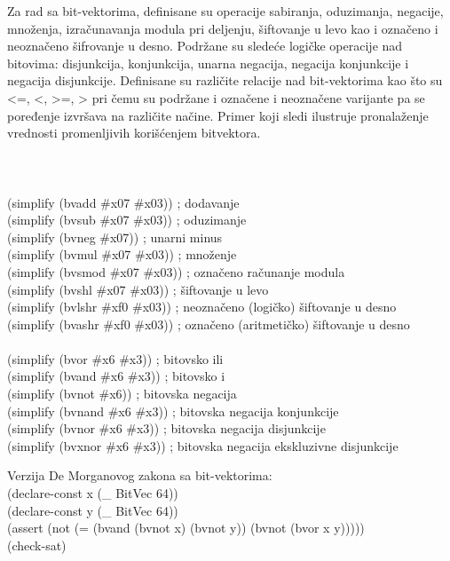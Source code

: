 \documentclass[12pt,oneside]{memoir}
\begin{document}
Za rad sa bit-vektorima, definisane su operacije sabiranja, oduzimanja, negacije, množenja, izračunavanja modula pri deljenju, šiftovanje u levo kao i označeno i neoznačeno šifrovanje u desno. Podržane su sledeće logičke operacije nad bitovima: disjunkcija, konjunkcija, unarna negacija, negacija konjunkcije i negacija disjunkcije. Definisane su različite relacije nad bit-vektorima kao što su <=, <, >=, > pri čemu su podržane i označene i neoznačene varijante pa se poređenje izvršava na različite načine. Primer koji sledi ilustruje pronalaženje vrednosti promenljivih korišćenjem bitvektora. 
\\
\\
\\
\\(simplify (bvadd \#x07 \#x03)) ; dodavanje
\\(simplify (bvsub \#x07 \#x03)) ; oduzimanje
\\(simplify (bvneg \#x07)) ; unarni minus
\\(simplify (bvmul \#x07 \#x03)) ; množenje
\\(simplify (bvsmod \#x07 \#x03)) ; označeno računanje modula
\\(simplify (bvshl \#x07 \#x03)) ; šiftovanje u levo
\\(simplify (bvlshr \#xf0 \#x03)) ; neoznačeno (logičko) šiftovanje u desno
\\(simplify (bvashr \#xf0 \#x03)) ; označeno (aritmetičko) šiftovanje u desno
\\
\\(simplify (bvor \#x6 \#x3))   ; bitovsko ili
\\(simplify (bvand \#x6 \#x3))  ; bitovsko i
\\(simplify (bvnot \#x6)) ; bitovska negacija
\\(simplify (bvnand \#x6 \#x3)) ; bitovska negacija konjunkcije
\\(simplify (bvnor \#x6 \#x3)) ; bitovska negacija disjunkcije
\\(simplify (bvxnor \#x6 \#x3)) ; bitovska negacija ekskluzivne disjunkcije


Verzija De Morganovog zakona sa bit-vektorima:
\\(declare-const x (\_ BitVec 64))
\\(declare-const y (\_ BitVec 64))
\\(assert (not (= (bvand (bvnot x) (bvnot y)) (bvnot (bvor x y)))))
\\(check-sat)
\end{document}
